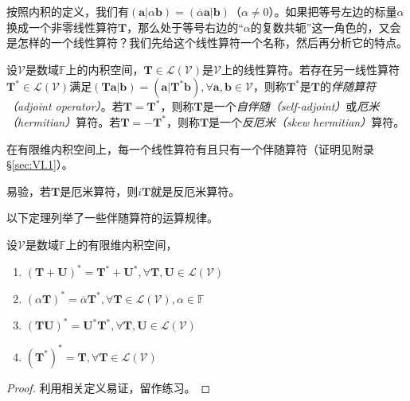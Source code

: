 \documentclass[main.tex]{subfiles}
\begin{document}
按照内积的定义，我们有$\left(\mathbf{a}|\alpha\mathbf{b}\right)=\left(\overline{\alpha}\mathbf{a}|\mathbf{b}\right)$（$\alpha\neq 0$）。如果把等号左边的标量$\alpha$换成一个非零线性算符$\mathbf{T}$，那么处于等号右边的“$\alpha$的复数共轭”这一角色的，又会是怎样的一个线性算符？我们先给这个线性算符一个名称，然后再分析它的特点。

\begin{definition}[伴随算符]\label{def:II.2.22}
    设$\mathcal{V}$是数域$\mathbb{F}$上的内积空间，$\mathbf{T}\in\mathcal{L}\left(\mathcal{V}\right)$是$\mathcal{V}$上的线性算符。若存在另一线性算符$\mathbf{T}^*\in\mathcal{L}\left(\mathcal{V}\right)$满足$\left(\mathbf{Ta}|\mathbf{b}\right)=\left(\mathbf{a}|\mathbf{T}^*\mathbf{b}\right),\forall\mathbf{a},\mathbf{b}\in\mathcal{V}$，则称$\mathbf{T}^*$是$\mathbf{T}$的\emph{伴随算符（adjoint operator）}。若$\mathbf{T}=\mathbf{T}^*$，则称$\mathbf{T}$是一个\emph{自伴随（self-adjoint）}或\emph{厄米（hermitian）}算符。若$\mathbf{T}=-\mathbf{T}^*$，则称$\mathbf{T}$是一个\emph{反厄米（skew hermitian）}算符。
\end{definition}

在有限维内积空间上，每一个线性算符有且只有一个伴随算符（证明见附录\S\ref{sec:VI.1}）。

易验，若$\mathbf{T}$是厄米算符，则$i\mathbf{T}$就是反厄米算符。

以下定理列举了一些伴随算符的运算规律。

\begin{theorem}\label{thm:II.2.30}
    设$\mathcal{V}$是数域$\mathbb{F}$上的有限维内积空间，
    \begin{enumerate}
        \item $\left(\mathbf{T}+\mathbf{U}\right)^*=\mathbf{T}^*+\mathbf{U}^*,\forall\mathbf{T},\mathbf{U}\in\mathcal{L}\left(\mathcal{V}\right)$
        \item $\left(\alpha\mathbf{T}\right)^*=\overline{\alpha}\mathbf{T}^*,\forall\mathbf{T}\in\mathcal{L}\left(\mathcal{V}\right),\alpha\in\mathbb{F}$
        \item $\left(\mathbf{TU}\right)^*=\mathbf{U}^*\mathbf{T}^*,\forall\mathbf{T},\mathbf{U}\in\mathcal{L}\left(\mathcal{V}\right)$
        \item $\left(\mathbf{T}^*\right)^*=\mathbf{T},\forall\mathbf{T}\in\mathcal{L}\left(\mathcal{V}\right)$
    \end{enumerate}
\end{theorem}
\begin{proof}
    利用相关定义易证，留作练习。
\end{proof}
\end{document}
